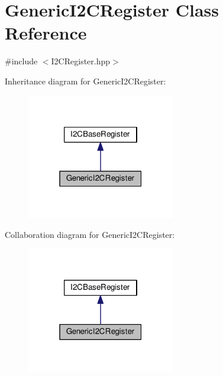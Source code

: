 \hypertarget{class_generic_i2_c_register}{}\section{Generic\+I2\+C\+Register Class Reference}
\label{class_generic_i2_c_register}


{\ttfamily \#include $<$I2\+C\+Register.\+hpp$>$}



Inheritance diagram for Generic\+I2\+C\+Register\+:
\nopagebreak
\begin{figure}[H]
\begin{center}
\leavevmode
\includegraphics[width=183pt]{class_generic_i2_c_register__inherit__graph}
\end{center}
\end{figure}


Collaboration diagram for Generic\+I2\+C\+Register\+:
\nopagebreak
\begin{figure}[H]
\begin{center}
\leavevmode
\includegraphics[width=183pt]{class_generic_i2_c_register__coll__graph}
\end{center}
\end{figure}
